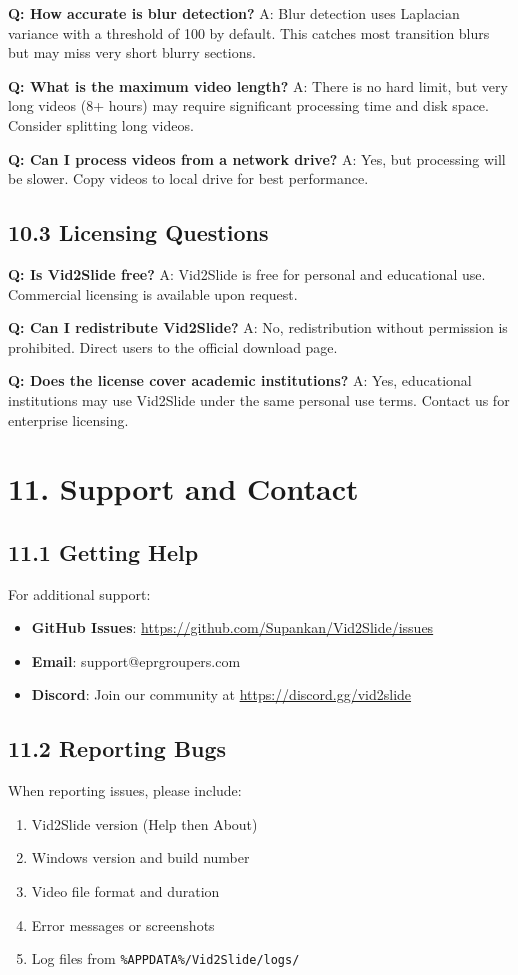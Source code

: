 \documentclass[12pt,a4paper]{article}
\newcommand{\sectionTitle}[1]{\section*{#1}}
\newcommand{\subsectionTitle}[1]{\subsection*{#1}}
\newcommand{\code}[1]{\texttt{#1}}
\begin{document}
\textbf{Q: How accurate is blur detection?}
A: Blur detection uses Laplacian variance with a threshold of 100 by default. This catches most transition blurs but may miss very short blurry sections.

\textbf{Q: What is the maximum video length?}
A: There is no hard limit, but very long videos (8+ hours) may require significant processing time and disk space. Consider splitting long videos.

\textbf{Q: Can I process videos from a network drive?}
A: Yes, but processing will be slower. Copy videos to local drive for best performance.

\subsectionTitle{10.3 Licensing Questions}

\textbf{Q: Is Vid2Slide free?}
A: Vid2Slide is free for personal and educational use. Commercial licensing is available upon request.

\textbf{Q: Can I redistribute Vid2Slide?}
A: No, redistribution without permission is prohibited. Direct users to the official download page.

\textbf{Q: Does the license cover academic institutions?}
A: Yes, educational institutions may use Vid2Slide under the same personal use terms. Contact us for enterprise licensing.

\newpage

\sectionTitle{11. Support and Contact}

\subsectionTitle{11.1 Getting Help}

For additional support:
\begin{itemize}
    \item \textbf{GitHub Issues}: \url{https://github.com/Supankan/Vid2Slide/issues}
    \item \textbf{Email}: support@eprgroupers.com
    \item \textbf{Discord}: Join our community at \url{https://discord.gg/vid2slide}
\end{itemize}

\subsectionTitle{11.2 Reporting Bugs}

When reporting issues, please include:
\begin{enumerate}
    \item Vid2Slide version (Help then About)
    \item Windows version and build number
    \item Video file format and duration
    \item Error messages or screenshots
    \item Log files from \code{\%APPDATA\%/Vid2Slide/logs/}
\end{enumerate}
\end{document}
